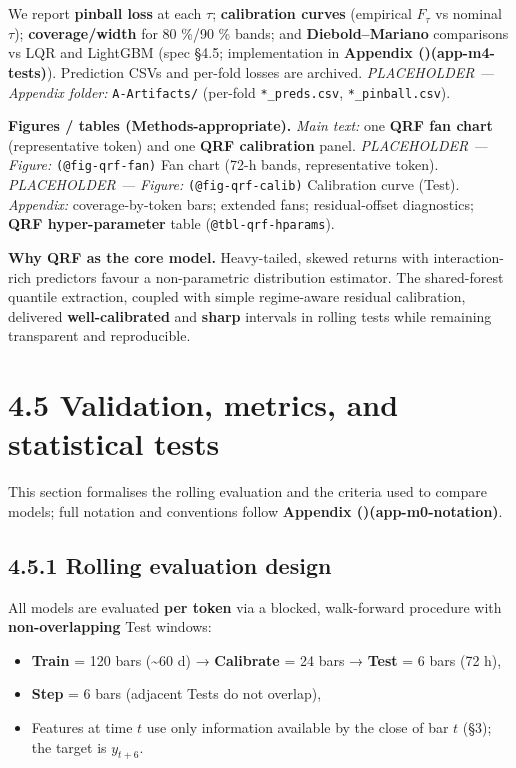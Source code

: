 \documentclass[
  a4paper,
  DIV=11,
  numbers=noendperiod]{scrreprt}
\providecommand{\tightlist}{%
  \setlength{\itemsep}{0pt}\setlength{\parskip}{0pt}}
\begin{document}
We report \textbf{pinball loss} at each \(\tau\); \textbf{calibration
curves} (empirical \(\widehat F_\tau\) vs nominal \(\tau\));
\textbf{coverage/width} for 80 \%/90 \% bands; and
\textbf{Diebold--Mariano} comparisons vs LQR and LightGBM (spec §4.5;
implementation in \textbf{Appendix
()(app-m4-tests)}). Prediction CSVs and
per-fold losses are archived. \emph{PLACEHOLDER --- Appendix folder:}
\texttt{A-Artifacts/} (per-fold \texttt{*\_preds.csv},
\texttt{*\_pinball.csv}).

\textbf{Figures / tables (Methods-appropriate).} \emph{Main text:} one
\textbf{QRF fan chart} (representative token) and one \textbf{QRF
calibration} panel. \emph{PLACEHOLDER --- Figure:}
\texttt{(@fig-qrf-fan)} Fan chart (72-h bands, representative token).
\emph{PLACEHOLDER --- Figure:} \texttt{(@fig-qrf-calib)} Calibration
curve (Test). \emph{Appendix:} coverage-by-token bars; extended fans;
residual-offset diagnostics; \textbf{QRF hyper-parameter} table
(\texttt{@tbl-qrf-hparams}).

\textbf{Why QRF as the core model.} Heavy-tailed, skewed returns with
interaction-rich predictors favour a non-parametric distribution
estimator. The shared-forest quantile extraction, coupled with simple
regime-aware residual calibration, delivered \textbf{well-calibrated}
and \textbf{sharp} intervals in rolling tests while remaining
transparent and reproducible.

\section{4.5 Validation, metrics, and statistical
tests}\label{validation-metrics-and-statistical-tests}

This section formalises the rolling evaluation and the criteria used to
compare models; full notation and conventions follow \textbf{Appendix
()(app-m0-notation)}.

\subsection{4.5.1 Rolling evaluation
design}\label{rolling-evaluation-design}

All models are evaluated \textbf{per token} via a blocked, walk-forward
procedure with \textbf{non-overlapping} Test windows:

\begin{itemize}
\tightlist
\item
  \textbf{Train} = 120 bars (\textasciitilde60 d) → \textbf{Calibrate} =
  24 bars → \textbf{Test} = 6 bars (72 h),
\item
  \textbf{Step} = 6 bars (adjacent Tests do not overlap),
\item
  Features at time \(t\) use only information available by the close of
  bar \(t\) (§3); the target is \(y_{t+6}\).
\end{itemize}
\end{document}
